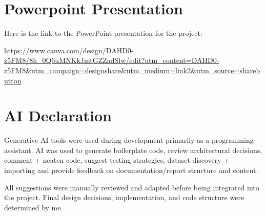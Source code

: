 \documentclass[11pt]{article}
\begin{document}
\section{Powerpoint Presentation}
Here is the link to the PowerPoint presentation for the project:
\begin{center}
    \url{https://www.canva.com/design/DAHD0-z5FM8/8h_0Q6uMNKkJmtGZZadSlw/edit?utm_content=DAHD0-z5FM8&utm_campaign=designshare&utm_medium=link2&utm_source=sharebutton}
\end{center}
\section{AI Declaration}

Generative AI tools were used during development primarily as a
programming assistant. AI was used to generate boilerplate code, review
architectural decisions, comment + neaten code, suggest testing strategies, dataset discovery + importing
 and provide feedback on documentation/report structure and content.

All suggestions were manually reviewed and adapted before being
integrated into the project. Final design decisions, implementation,
and code structure were determined by me.
\end{document}

